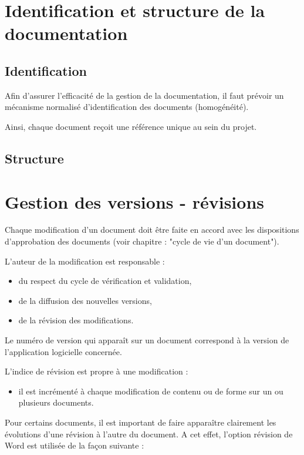 \documentclass[a4paper]{article}
\begin{document}
\section{Identification et structure de la documentation}

\subsection{Identification}

Afin d’assurer l’efficacité de la gestion de la documentation, il faut prévoir un mécanisme normalisé d’identification des documents (homogénéité).

Ainsi, chaque document reçoit une référence unique au sein du projet.

\subsection{Structure}

\section{Gestion des versions - révisions}

Chaque modification d’un document doit être faite en accord avec les dispositions d’approbation des documents (voir chapitre : "cycle de vie d’un document"). 

L’auteur de la modification est responsable :

\begin{itemize}
\item du respect du cycle de vérification et validation,
\item de la diffusion des nouvelles versions,
\item de la révision des modifications.
\end{itemize}

Le numéro de version qui apparaît sur un document correspond à la version de l'application logicielle concernée.

L'indice de révision est propre à une modification :

\begin{itemize}
\item il est incrémenté à chaque modification de contenu ou de forme sur un ou plusieurs documents.
\end{itemize}

Pour certains documents, il est important de faire apparaître clairement les évolutions d'une révision à l'autre du document. A cet effet, l'option révision de Word est utilisée de la façon suivante :
\end{document}
